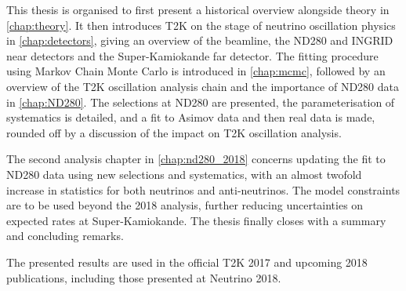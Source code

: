 This thesis is organised to first present a historical overview alongside theory in \autoref{chap:theory}. It then introduces T2K on the stage of neutrino oscillation physics in \autoref{chap:detectors}, giving an overview of the beamline, the ND280 and INGRID near detectors and the Super-Kamiokande far detector. The fitting procedure using Markov Chain Monte Carlo is introduced in \autoref{chap:mcmc}, followed by an overview of the T2K oscillation analysis chain and the importance of ND280 data in \autoref{chap:ND280}. The selections at ND280 are presented, the parameterisation of systematics is detailed, and a fit to Asimov data and then real data is made, rounded off by a discussion of the impact on T2K oscillation analysis.

The second analysis chapter in \autoref{chap:nd280_2018} concerns updating the fit to ND280 data using new selections and systematics, with an almost twofold increase in statistics for both neutrinos and anti-neutrinos. The model constraints are to be used beyond the 2018 analysis, further reducing uncertainties on expected rates at Super-Kamiokande. The thesis finally closes with a summary and concluding remarks.

The presented results are used in the official T2K 2017\cite{t2k_2017} and upcoming 2018 publications, including those presented at Neutrino 2018\cite{t2k_neutrino2018}.